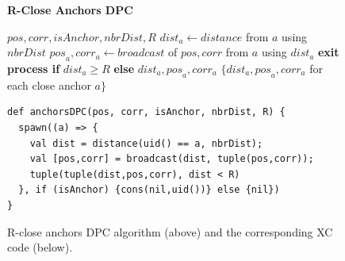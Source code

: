 \documentclass[runningheads]{llncs}
\newcommand{\Exit}[1]{\textbf{exit process if} #1 \textbf{else}}
\begin{document}
\begin{figure}[t]
\textbf{R-Close Anchors DPC}
\begin{algorithmic}[1]
    \Require $\mathit{pos}, \mathit{corr}, \mathit{isAnchor}, \mathit{nbrDist}, \mathit{R}$
        \State $\mathit{dist}_a \gets \mathit{distance}$ from $a$ using $\mathit{nbrDist}$
        \State $\mathit{pos}_a, \mathit{corr}_a \gets \mathit{broadcast}$ of $\mathit{pos}, \mathit{corr}$ from $a$ using $\mathit{dist}_a$
        \State \Exit{$\mathit{dist}_a \ge \mathit{R}$}
        \State \Return $\mathit{dist}_a, \mathit{pos}_a, \mathit{corr}_a$
    \EndSpawn
    \State \Return $\{\mathit{dist}_a, \mathit{pos}_a, \mathit{corr}_a$ for each close anchor $a\}$
\end{algorithmic}
\medskip
\begin{lstlisting}[language=xc,mathescape]
def anchorsDPC(pos, corr, isAnchor, nbrDist, R) {
  spawn((a) => {
    val dist = distance(uid() == a, nbrDist);
    val [pos,corr] = broadcast(dist, tuple(pos,corr));
    tuple(tuple(dist,pos,corr), dist < R)
  }, if (isAnchor) {cons(nil,uid())} else {nil})
}
\end{lstlisting}
    \caption{R-close anchors DPC algorithm (above) and the corresponding XC code (below).}
    \label{code:rclose}
\end{figure}
\end{document}
